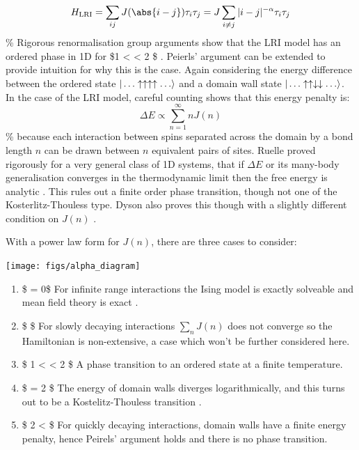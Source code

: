 \[H_{\mathrm{LRI}} = \sum_{ij} J(\abs{i-j}) \tau_i \tau_j = J \sum_{i\neq j} |i - j|^{-\alpha} \tau_i \tau_j\] \% Rigorous renormalisation group arguments show that the LRI model has an ordered phase in 1D for \$1 \textless{} \alpha \textless{} 2 \$ \autocite{dysonExistencePhasetransitionOnedimensional1969}. Peierls' argument can be extended \autocite{thoulessLongRangeOrderOneDimensional1969} to provide intuition for why this is the case. Again considering the energy difference between the ordered state \(|\ldots\uparrow\uparrow\uparrow\uparrow\ldots\rangle\) and a domain wall state \(|\ldots\uparrow\uparrow\downarrow\downarrow\ldots\rangle\). In the case of the LRI model, careful counting shows that this energy penalty is: \[\Delta E \propto \sum_{n=1}^{\infty} n J(n)\] \% because each interaction between spins separated across the domain by a bond length \(n\) can be drawn between \(n\) equivalent pairs of sites. Ruelle proved rigorously for a very general class of 1D systems, that if \(\Delta E\) or its many-body generalisation converges in the thermodynamic limit then the free energy is analytic \autocite{ruelleStatisticalMechanicsOnedimensional1968}. This rules out a finite order phase transition, though not one of the Kosterlitz-Thouless type. Dyson also proves this though with a slightly different condition on \(J(n)\) \autocite{dysonExistencePhasetransitionOnedimensional1969}.

With a power law form for \(J(n)\), there are three cases to consider:

\begin{center}
    \texttt{[image: figs/alpha\_diagram]}
\end{center}

\begin{enumerate}
\def\labelenumi{\arabic{enumi}.}
\tightlist
\item
  \$ \alpha = 0\$ For infinite range interactions the Ising model is exactly solveable and mean field theory is exact \autocite{lipkinValidityManybodyApproximation1965}.
\item
  \$ \alpha {}\$ For slowly decaying interactions \(\sum_n J(n)\) does not converge so the Hamiltonian is non-extensive, a case which won't be further considered here.
\item
  \$ 1 \textless{} \alpha \textless{} 2 \$ A phase transition to an ordered state at a finite temperature.
\item
  \$ \alpha = 2 \$ The energy of domain walls diverges logarithmically, and this turns out to be a Kostelitz-Thouless transition \autocite{thoulessLongRangeOrderOneDimensional1969}.
\item
  \$ 2 \textless{} \alpha \$ For quickly decaying interactions, domain walls have a finite energy penalty, hence Peirels' argument holds and there is no phase transition.
\end{enumerate}

